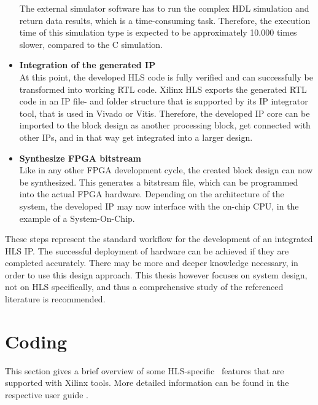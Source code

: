 \begin{itemize}
      The external simulator software has to run the complex HDL simulation and return data results, which is a time-consuming task.
      Therefore, the execution time of this simulation type is expected to be approximately 10.000 times slower, compared to the C simulation.\\

  \item \textbf{Integration of the generated IP}\\
      At this point, the developed HLS code is fully verified and can successfully be transformed into working RTL code.
      Xilinx HLS exports the generated RTL code in an IP file- and folder structure that is supported by its IP integrator tool, that is used in Vivado or Vitis.
      Therefore, the developed IP core can be imported to the block design as another processing block, get connected with other IPs, and in that way get integrated into a larger design.\\

  \item \textbf{Synthesize FPGA bitstream}\\
      Like in any other FPGA development cycle, the created block design can now be synthesized.
      This generates a bitstream file, which can be programmed into the actual FPGA hardware.
      Depending on the architecture of the system, the developed IP may now interface with the on-chip CPU, in the example of a System-On-Chip.\\
\end{itemize}

These steps represent the standard workflow for the development of an integrated HLS IP.
The successful deployment of hardware can be achieved if they are completed accurately.
There may be more and deeper knowledge necessary, in order to use this design approach.
This thesis however focuses on system design, not on HLS specifically, and thus a comprehensive study of the referenced literature is recommended.

\section{Coding}

This section gives a brief overview of some HLS-specific \cplusplus\ features that are supported with Xilinx tools.
More detailed information can be found in the respective user guide \cite{VivadoUgHLS}.

